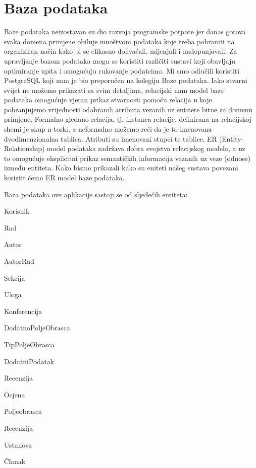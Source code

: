 		\section{Baza podataka}
			
			

		Baze podataka neizostavan su dio razvoja programske potpore jer danas gotova svaka domena primjene obiluje mnoštvom podataka koje treba pohraniti na organiziran način kako bi se efikasno dohvaćali, mijenjali i nadopunjavali. Za upravljanje bazom podataka mogu se koristiti različiti sustavi koji obavljaju optimiranje upita i omogućuju rukovanje podatcima. Mi smo odlučili koristiti PostgreSQL koji nam je bio preporučen na kolegiju Baze podataka. \newline Iako stvarni svijet ne možemo prikazati sa svim detaljima, relacijski nam model baze podataka omogućuje vjeran prikaz stvarnosti pomoću relacija u koje pohranjujemo vrijednosti odabranih atributa vezanih uz entitete bitne za domenu primjene. Formalno gledano relacija, tj. instanca relacije, definirana na relacijskoj shemi je skup n-torki, a neformalno možemo reći da je to imenovana dvodimenzionalna tablica. Atributi su imenovani stupci te tablice. ER (Entity-Relationship) model podataka zadržava dobra svojstva relacijskog modela, a uz to omogućuje eksplicitni prikaz semantičkih informacija vezanih uz veze (odnose) između entiteta. Kako bismo prikazali kako su eniteti našeg sustava povezani koristit ćemo ER model baze podataka.

		Baza podataka ove aplikacije sastoji se od sljedećih entiteta:
		\begin{packed_item}
			\item Korisnik
			\item Rad
			\item Autor
			\item AutorRad
			\item Sekcija
			\item Uloga
			\item Konferencija
			\item DodatnoPoljeObrasca
			\item TipPoljeObrasca
			\item DodatniPodatak 
			\item Recenzija
			\item Ocjena
			\item Poljeobrasca
			\item Recenzija
			\item Ustanova
			\item Članak
		\end{packed_item}
		
